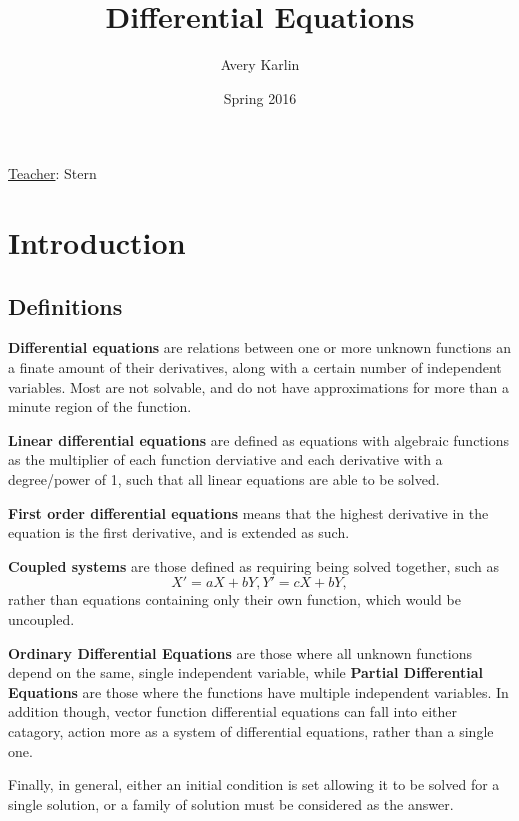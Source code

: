\documentclass[11 pt, twoside]{article}
\begin{document}
\title{Differential Equations}
\author{Avery Karlin}
\date{Spring 2016}
\newcommand{\teacher}{Stern}

\maketitle
\newpage
\tableofcontents
\vspace{11pt}
\noindent
\underline{Teacher}: \teacher
\newpage

\section{Introduction}

\subsection{Definitions}

\textbf{Differential equations} are relations between one or more unknown functions an a finate amount of their derivatives, along with a certain number of independent variables. Most are not solvable, and do not have approximations for more than a minute region of the function.

\textbf{Linear differential equations} are defined as equations with algebraic functions as the multiplier of each function derviative and each derivative with a degree/power of 1, such that all linear equations are able to be solved.

\textbf{First order differential equations} means that the highest derivative in the equation is the first derivative, and is extended as such.

\textbf{Coupled systems} are those defined as requiring being solved together, such as $$X' = aX + bY, Y' = cX + bY,$$ rather than equations containing only their own function, which would be uncoupled.

\textbf{Ordinary Differential Equations} are those where all unknown functions depend on the same, single independent variable, while \textbf{Partial Differential Equations} are those where the functions have multiple independent variables. In addition though, vector function differential equations can fall into either catagory, action more as a system of differential equations, rather than a single one.

Finally, in general, either an initial condition is set allowing it to be solved for a single solution, or a family of solution must be considered as the answer.
\end{document}
